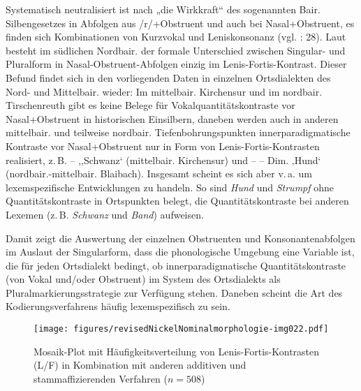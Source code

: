 Systematisch neutralisiert ist nach \citet[45]{Zehetner1978} „die Wirkkraft“ des sogenannten Bair. Silbengesetzes in Abfolgen aus /r/+Obstruent und auch bei Nasal+Obstruent, es finden sich Kombinationen von Kurzvokal und Leniskonsonanz (vgl. \citealt{Hinderling1980}: 28). Laut \citet[123]{Rowley1997} besteht im südlichen Nordbair. der formale Unterschied zwischen Singular- und Pluralform in Nasal-Obstruent-Abfolgen einzig im Lenis-Fortis-Kontrast. Dieser Befund findet sich in den vorliegenden Daten in einzelnen Ortsdialekten des Nord- und Mittelbair. wieder: Im mittelbair. Kirchensur und im nordbair. Tirschenreuth gibt es keine Belege für Vokalquantitätskontraste vor Nasal+Obstruent in historischen Einsilbern, daneben werden auch in anderen mittelbair. und teilweise nordbair. Tiefenbohrungspunkten innerparadigmatische Kontraste vor Nasal+Obstruent nur in Form von Lenis-Fortis-Kontrasten realisiert, z.\,B.  --  ,‚Schwanz‘ (mittelbair. Kirchensur) und   --  -- Dim.  ‚Hund‘ (nordbair.-mittelbair. Blaibach). Insgesamt scheint es sich aber v.\,a. um lexemspezifische Entwicklungen zu handeln. So sind \textit{Hund} und \textit{Strumpf} ohne Quantitätskontraste in Ortspunkten belegt, die Quantitätskontraste bei anderen Lexemen (z.\,B. \textit{Schwanz} und \textit{Band}) aufweisen.

Damit zeigt die Auswertung der einzelnen Obstruenten und Konsonantenabfolgen im Auslaut der Singularform, dass die phonologische Umgebung eine Variable ist, die für jeden Ortsdialekt bedingt, ob innerparadigmatische Quantitätskontraste (von Vokal und/oder Obstruent) im System des Ortsdialekts als Pluralmarkierungsstrategie zur Verfügung stehen. Daneben scheint die Art des Kodierungsverfahrens häufig lexemspezifisch zu sein.


\begin{figure}
\texttt{[image: figures/revisedNickelNominalmorphologie-img022.pdf]}
\caption{Mosaik-Plot mit Häufigkeitsverteilung von Lenis-Fortis-Kontrasten (L/F) in Kombination mit anderen additiven und stammaffizierenden Verfahren ($n=508$)}
\label{fig:6}
\end{figure}

